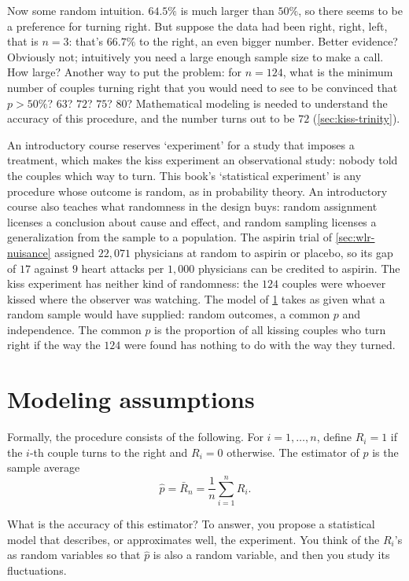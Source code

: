 Now some random intuition.
$64.5\%$ is much larger than $50\%$, so there seems to be a preference for turning right.
But suppose the data had been right, right, left, that is $n = 3$: that's $66.7\%$ to the right, an even bigger number.
Better evidence?
Obviously not; intuitively you need a large enough sample size to make a call.
How large?
Another way to put the problem: for $n = 124$, what is the minimum number of couples turning right that you would need to see to be convinced that $p > 50\%$?
$63$? $72$? $75$? $80$?
Mathematical modeling is needed to understand the accuracy of this procedure, and the number turns out to be $72$ (\cref{sec:kiss-trinity}).

\begin{bridge}
An introductory course reserves `experiment' for a study that imposes a treatment, which makes the kiss experiment an observational study: nobody told the couples which way to turn.
This book's `statistical experiment' is any procedure whose outcome is random, as in probability theory.
An introductory course also teaches what randomness in the design buys: random assignment licenses a conclusion about cause and effect, and random sampling licenses a generalization from the sample to a population.
The aspirin trial of \cref{sec:wlr-nuisance} assigned $22{,}071$ physicians at random to aspirin or placebo, so its gap of $17$ against $9$ heart attacks per $1{,}000$ physicians can be credited to aspirin.
The kiss experiment has neither kind of randomness: the $124$ couples were whoever kissed where the observer was watching.
The model of \cref{sec:kiss-assumptions} takes as given what a random sample would have supplied: random outcomes, a common $p$ and independence.
The common $p$ is the proportion of all kissing couples who turn right if the way the $124$ were found has nothing to do with the way they turned.
\end{bridge}

\section{Modeling assumptions}
\label{sec:kiss-assumptions}

Formally, the procedure consists of the following.
For $i = 1, \ldots, n$, define $R_i = 1$ if the $i$-th couple turns to the right and $R_i = 0$ otherwise.
The estimator of $p$ is the sample average
\[
\hat{p} = \bar{R}_n = \frac{1}{n} \sum_{i=1}^n R_i.
\]

What is the accuracy of this estimator?
To answer, you propose a statistical model that describes, or approximates well, the experiment.
You think of the $R_i$'s as random variables so that $\hat{p}$ is also a random variable, and then you study its fluctuations.

